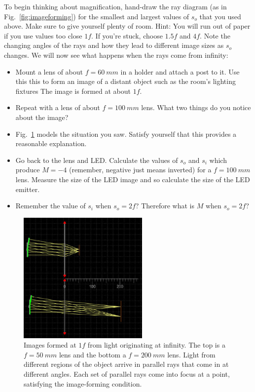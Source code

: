 \documentclass[a4paper]{report}
\begin{document}
To begin thinking about magnification, hand-draw the ray diagram (as in Fig.~\ref{fig:imageforming}) for the smallest and largest values of $s_o$ that you used above. 
Make sure to give yourself plenty of room. 
Hint: You will run out of paper if you use values too close $1f$.
If you're stuck, choose $1.5f$ and $4f$.
Note the changing angles of the rays and how they lead to different image sizes as $s_o$ changes. 
We will now see what happens when the rays come from infinity:

\begin{itemize}
\item Mount a lens of about $f=60~mm$ in a holder and attach a post to it. 
Use this this to form an image of a distant object such as the room's lighting fixtures
The image is formed at about $1f$.
\item Repeat with a lens of about $f=100~mm$ lens. 
What two things do you notice about the image? 
\item Fig.~\ref{fig:outside} models the situation you saw. Satisfy yourself that this provides a reasonable explanation. 
\item Go back to the lens and LED.
Calculate the values of $s_o$ and $s_i$ which produce $M=-4$ (remember, negative just means inverted) for a $f=100~mm$ lens. 
Measure the size of the LED image and so calculate the size of the LED emitter. 
\item Remember the value of $s_i$ when $s_o=2f$? Therefore what is $M$ when $s_o=2f$?
\end{itemize}


\begin{figure}[h]
\center
\includegraphics[width=2.5in]{image_forming_outside.eps}
\caption{Images formed at $1f$ from light originating at infinity. 
The top is a $f=50~mm$ lens and the bottom a $f=200~mm$ lens.
Light from different regions of the object arrive in parallel rays that come in at different angles. 
Each set of parallel rays come into focus at a point, satisfying the image-forming condition. }
\label{fig:outside}
\end{figure}
\end{document}
